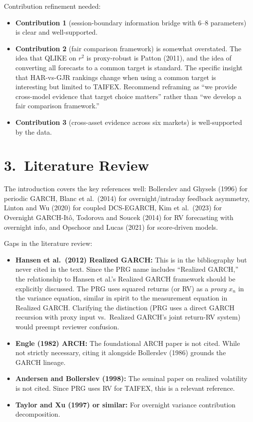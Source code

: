 \documentclass[12pt,a4paper]{article}
\begin{document}
\textcolor{warncolor}{Contribution refinement needed:}
\begin{itemize}[nosep]
\item \textbf{Contribution 1} (session-boundary information bridge with 6--8 parameters) is clear and well-supported.
\item \textbf{Contribution 2} (fair comparison framework) is somewhat overstated. The idea that QLIKE on $r^2$ is proxy-robust is Patton (2011), and the idea of converting all forecasts to a common target is standard. The specific insight that HAR-vs-GJR rankings change when using a common target is interesting but limited to TAIFEX. Recommend reframing as ``we provide cross-model evidence that target choice matters'' rather than ``we develop a fair comparison framework.''
\item \textbf{Contribution 3} (cross-asset evidence across six markets) is well-supported by the data.
\end{itemize}


\section*{3.\ Literature Review}

The introduction covers the key references well: Bollerslev and Ghysels (1996) for periodic GARCH, Blanc et al.\ (2014) for overnight/intraday feedback asymmetry, Linton and Wu (2020) for coupled DCS-EGARCH, Kim et al.\ (2023) for Overnight GARCH-It\^{o}, Todorova and Soucek (2014) for RV forecasting with overnight info, and Opschoor and Lucas (2021) for score-driven models.

\textcolor{warncolor}{Gaps in the literature review:}
\begin{itemize}[nosep]
\item \textbf{Hansen et al.\ (2012) Realized GARCH:} This is in the bibliography but never cited in the text. Since the PRG name includes ``Realized GARCH,'' the relationship to Hansen et al.'s Realized GARCH framework should be explicitly discussed. The PRG uses squared returns (or RV) as a \emph{proxy} $x_n$ in the variance equation, similar in spirit to the measurement equation in Realized GARCH. Clarifying the distinction (PRG uses a direct GARCH recursion with proxy input vs.\ Realized GARCH's joint return-RV system) would preempt reviewer confusion.
\item \textbf{Engle (1982) ARCH:} The foundational ARCH paper is not cited. While not strictly necessary, citing it alongside Bollerslev (1986) grounds the GARCH lineage.
\item \textbf{Andersen and Bollerslev (1998):} The seminal paper on realized volatility is not cited. Since PRG uses RV for TAIFEX, this is a relevant reference.
\item \textbf{Taylor and Xu (1997) or similar:} For overnight variance contribution decomposition.
\end{itemize}
\end{document}
